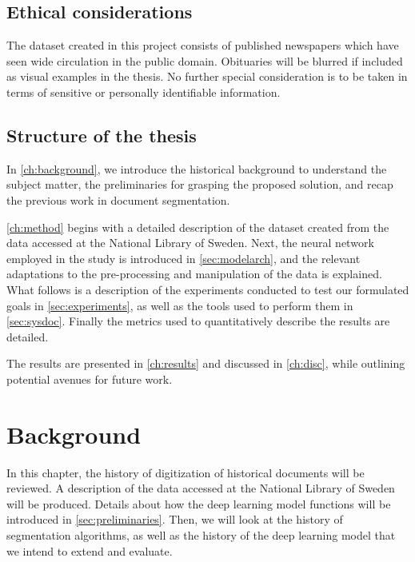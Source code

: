 \documentclass[oneside, english, bibtex]{kththesis}
\begin{document}
\section{Ethical considerations}

The dataset created in this project consists of published newspapers which have seen wide circulation in the public domain. 
Obituaries will be blurred if included as visual examples in the thesis. No further special consideration is to be taken in terms of sensitive or personally identifiable information.

\section{Structure of the thesis}

In \autoref{ch:background}, we introduce the historical background to understand the subject matter, the preliminaries for grasping the proposed solution, and recap the previous work in document segmentation.

\autoref{ch:method} begins with a detailed description of the dataset created from the data accessed at the National Library of Sweden.
Next, the neural network employed in the study is introduced in \autoref{sec:modelarch}, and the relevant adaptations to the pre-processing and manipulation of the data is explained.
What follows is a description of the experiments conducted to test our formulated goals in \autoref{sec:experiments}, as well as the tools used to perform them in \autoref{sec:sysdoc}.
Finally the metrics used to quantitatively describe the results are detailed.

The results are presented in \autoref{ch:results} and discussed in \autoref{ch:disc},
while outlining potential avenues for future work.

\cleardoublepage
\chapter{Background}
\label{ch:background}

In this chapter, the history of digitization of historical documents will be reviewed. A description of the data accessed at the National Library of Sweden will be produced. Details about how the deep learning model functions will be introduced in \autoref{sec:preliminaries}. Then, we will look at the history of segmentation algorithms, as well as the history of the deep learning model that we intend to extend and evaluate. 
\end{document}

